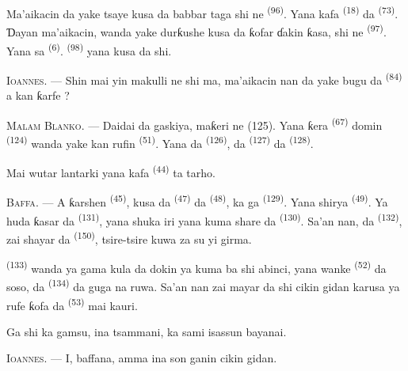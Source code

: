 Ma’aikacin da yake tsaye kusa da babbar taga shi ne  \textsuperscript{(96)}. Yana kafa 
\textsuperscript{(18)} da  \textsuperscript{(73)}. Ɗayan
ma’aikacin, wanda yake durƙushe kusa da ƙofar ɗakin ƙasa, shi ne
 \textsuperscript{(97)}. Yana sa
 \textsuperscript{(6)}. 
\textsuperscript{(98)} yana kusa da shi.

\textsc{Ioannes}. --- Shin mai yin makulli ne shi ma, ma’aikacin nan
da yake bugu da  \textsuperscript{(84)} a kan ƙarfe ?

\textsc{Malam Blanko}. --- Daidai da gaskiya, maƙeri ne (125). Yana
ƙera  \textsuperscript{(67)} domin  \textsuperscript{(124)} wanda yake kan rufin  \textsuperscript{(51)}. Yana da 
\textsuperscript{(126)}, da  \textsuperscript{(127)} da
 \textsuperscript{(128)}.

Mai wutar lantarki yana kafa  
\textsuperscript{(44)} ta tarho.

\VUsaut{3.0mm}

\textsc{Baffa}. --- A ƙarshen  \textsuperscript{(45)},
kusa da  \textsuperscript{(47)} da  \textsuperscript{(48)}, ka ga 
\textsuperscript{(129)}. Yana shirya 
\textsuperscript{(49)}. Ya huda ƙasar da 
\textsuperscript{(131)}, yana shuka iri yana kuma share da
 \textsuperscript{(130)}. Sa’an nan, da
 \textsuperscript{(132)}, zai shayar da
 \textsuperscript{(150)}, tsire-tsire kuwa za su
yi girma.

 \textsuperscript{(133)} wanda ya gama kula da
dokin ya kuma ba shi abinci, yana wanke 
\textsuperscript{(52)} da soso, da 
\textsuperscript{(134)} da guga na ruwa. Sa’an nan zai mayar da shi
cikin gidan karusa ya rufe ƙofa da 
\textsuperscript{(53)} mai kauri.

Ga shi ka gamsu, ina tsammani, ka sami isassun bayanai.

\textsc{Ioannes}. --- I, baffana, amma ina son ganin cikin gidan.

